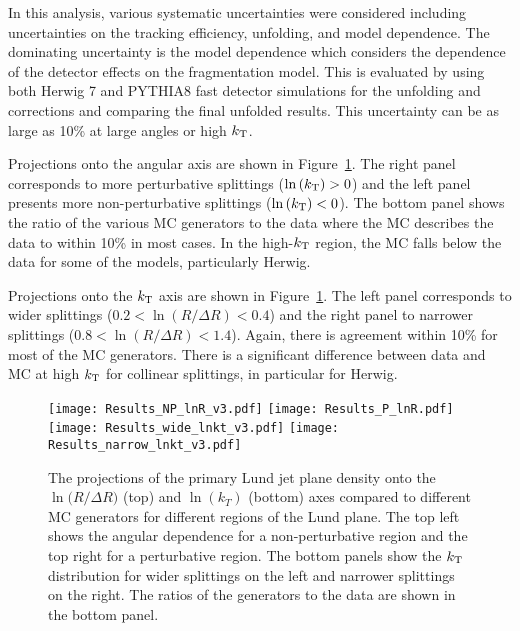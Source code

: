 \documentclass{PoS}
\begin{document}
In this analysis, various systematic uncertainties were considered including uncertainties on the tracking efficiency, unfolding, and model dependence. The dominating uncertainty is the model dependence which considers the dependence of the detector effects on the fragmentation model. This is evaluated by using both Herwig 7 and PYTHIA8 fast detector simulations for the unfolding and corrections and comparing the final unfolded results. This uncertainty can be as large as 10\% at large angles or high $k_{\rm T}$. 

Projections onto the angular axis are shown in Figure~\ref{fig:Proj}. The right panel corresponds to more perturbative splittings ($\ln{(k_{\rm{T}})} > 0$) and the left panel presents more non-perturbative splittings ($\ln{(k_{\rm{T}})} < 0$). The bottom panel shows the ratio of the various MC generators to the data where the MC describes the data to within 10\% in most cases. In the high-$k_{\rm{T}}$ region, the MC falls below the data for some of the models, particularly Herwig. %

Projections onto the $k_{\rm{T}}$ axis are shown in Figure~\ref{fig:Proj}. The left panel corresponds to wider splittings ($0.2 < \ln{(R/\Delta{R})} < 0.4$) and the right panel to narrower splittings ($0.8 < \ln{(R/\Delta{R})} < 1.4$). Again, there is agreement within 10\% for most of the MC generators. There is a significant difference between data and MC at high $k_{\rm{T}}$ for collinear splittings, in particular for Herwig.

\begin{figure}[ht!]
    \centering
    \texttt{[image: Results\_NP\_lnR\_v3.pdf]}
    \texttt{[image: Results\_P\_lnR.pdf]}  \\
    \texttt{[image: Results\_wide\_lnkt\_v3.pdf]}
    \texttt{[image: Results\_narrow\_lnkt\_v3.pdf]}
    \caption{The projections of the primary Lund jet plane density onto the $\ln({R/\Delta R)}$ (top) and $\ln{(k_{T})}$ (bottom) axes compared to different MC generators for different regions of the Lund plane. The top left shows the angular dependence for a non-perturbative region and the top right for a perturbative region. The bottom panels show the $k_{\rm T}$ distribution for wider splittings on the left and narrower splittings on the right. The ratios of the generators to the data are shown in the bottom panel. }
    \label{fig:Proj}
\end{figure}
\end{document}
